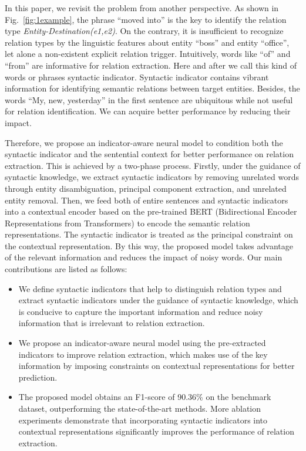 \documentclass[conference]{IEEEtran}
\begin{document}
In this paper, we revisit the problem from another perspective. As shown in Fig.~\ref{fig:1example}, the phrase “moved into” is the key to identify the relation type {\em Entity-Destination(e1,e2)}. On the contrary, it is insufficient to recognize relation types by the linguistic features about entity “boss” and entity “office”, let alone a non-existent explicit relation trigger. Intuitively, words like “of” and “from” are informative for relation extraction. Here and after we call this kind of words or phrases syntactic indicator. Syntactic indicator contains vibrant information for identifying semantic relations between target entities. Besides, the words “My, new, yesterday” in the first sentence are ubiquitous while not useful for relation identification. We can acquire better performance by reducing their impact. 

Therefore, we propose an indicator-aware neural model to condition both the syntactic indicator and the sentential context for better performance on relation extraction. This is achieved by a two-phase process. Firstly, under the guidance of syntactic knowledge, we extract syntactic indicators by removing unrelated words through entity disambiguation, principal component extraction, and unrelated entity removal. Then, we feed both of entire sentences and syntactic indicators into a contextual encoder based on the pre-trained BERT (Bidirectional Encoder Representations from Transformers) \cite{devlin2019bert} to encode the semantic relation representations. The syntactic indicator is treated as the principal constraint on the contextual representation. By this way, the proposed model takes advantage of the relevant information and reduces the impact of noisy words. Our main contributions are listed as follows:
\begin{itemize}
\item We define syntactic indicators that help to distinguish relation types and extract syntactic indicators under the guidance of syntactic knowledge, which is conducive to capture the important information and reduce noisy information that is irrelevant to relation extraction.
\item We propose an indicator-aware neural model using the pre-extracted indicators to improve relation extraction, which makes use of the key information by imposing constraints on contextual representations for better prediction.
\item The proposed model obtains an F1-score of 90.36\% on the benchmark dataset, outperforming the state-of-the-art methods. More ablation experiments demonstrate that incorporating syntactic indicators into contextual representations significantly improves the performance of relation extraction.
\end{itemize}
\end{document}
